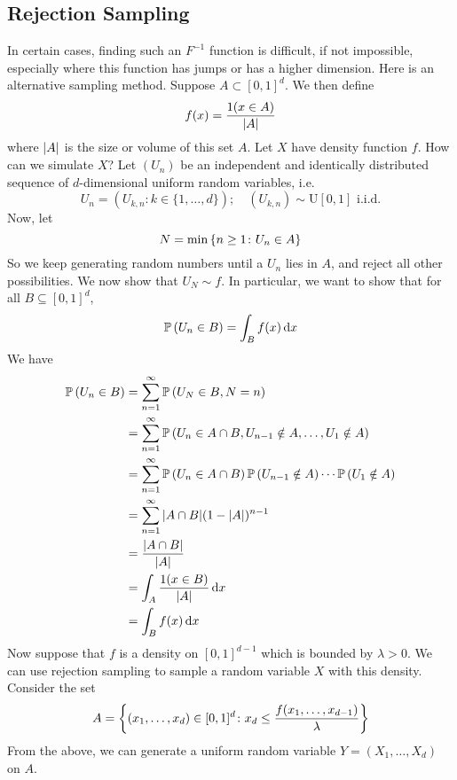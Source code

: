 \subsection{Rejection Sampling}
In certain cases, finding such an \(F^{-1}\) function is difficult, if not impossible, especially where this function has jumps or has a higher dimension.
Here is an alternative sampling method.
Suppose \(A \subset [0, 1]^d\).
We then define
\[
	f(x) = \frac{1(x \in A)}{\abs{A}}
\]
where \(\abs{A}\) is the size or volume of this set \(A\).
Let \(X\) have density function \(f\).
How can we simulate \(X\)?
Let \((U_n)\) be an independent and identically distributed sequence of \(d\)-dimensional uniform random variables, i.e.
\[
	U_n = (U_{k, n} \colon k \in \{ 1, \dots, d \});\quad (U_{k, n}) \sim \mathrm{U}[0, 1] \text{ i.i.d.}
\]
Now, let
\[
	N = \min\qty{n \geq 1 \colon U_n \in A}
\]
So we keep generating random numbers until a \(U_n\) lies in \(A\), and reject all other possibilities.
We now show that \(U_N \sim f\).
In particular, we want to show that for all \(B \subseteq [0, 1]^d\),
\[
	\mathbb{P}\left({U_n \in B}\right) = \int_B f(x) \dd{x}
\]
We have
\begin{align*}
	\mathbb{P}\left({U_n \in B}\right) & = \sum_{n=1}^\infty \mathbb{P}\left({U_N \in B, N = n}\right)                                                    \\
	                 & = \sum_{n=1}^\infty \mathbb{P}\left({U_n \in A \cap B, U_{n-1} \notin A, \dots, U_1 \notin A}\right)             \\
	                 & = \sum_{n=1}^\infty \mathbb{P}\left({U_n \in A \cap B}\right) \mathbb{P}\left({U_{n-1} \notin A}\right) \cdots \mathbb{P}\left({U_1 \notin A}\right) \\
	                 & = \sum_{n=1}^\infty \abs{A \cap B} (1 -\abs{A})^{n-1}                                          \\
	                 & = \frac{\abs{A \cap B}}{\abs{A}}                                                               \\
	                 & = \int_A \frac{1(x \in B)}{\abs{A}} \dd{x}                                                     \\
	                 & = \int_B f(x) \dd{x}
\end{align*}
Now suppose that \(f\) is a density on \([0, 1]^{d-1}\) which is bounded by \(\lambda > 0\).
We can use rejection sampling to sample a random variable \(X\) with this density.
Consider the set
\[
	A = \qty{(x_1, \dots, x_d) \in [0, 1]^d \colon x_d \leq \frac{f(x_1, \dots, x_{d-1})}{\lambda}}
\]
From the above, we can generate a uniform random variable \(Y = (X_1, \dots, X_d)\) on \(A\).
